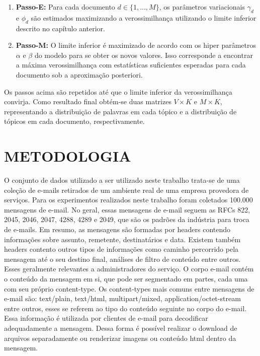 \documentclass[12pt,a4paper]{article}
\begin{document}
\begin{enumerate}
\item \textbf{Passo-E:} Para cada documento $d \in \{1,. . . , M\}$, os parâmetros variacionais $\gamma_d$ e $\phi_d$ são estimados maximizando a verossimilhança utilizando o limite inferior descrito no capítulo anterior.
\item \textbf{Passo-M:} O limite inferior é maximizado  de acordo com os hiper parâmetros $\alpha$ e $\beta$ do modelo para se obter os novos valores. 
 Isso corresponde a encontrar a máxima verossimilhança com estatísticas suficientes esperadas para cada documento sob a aproximação posteriori.
\end{enumerate}

Os passos acima são repetidos até que o limite inferior da verossimilhança convirja. Como resultado final obtém-se duas matrizes $V \times K$ e $M \times K$,
 representando  a distribuição de palavras em cada tópico e a distribuição de tópicos em cada documento, respectivamente.



\section{METODOLOGIA} \label{sec:metodologia}
O conjunto de dados utilizado a ser utilizado neste trabalho trata-se de uma coleção de e-mails retirados de um ambiente real de uma empresa provedora de serviços. 
 Para os experimentos realizados neste trabalho foram coletados 100.000 mensagens de e-mail. No geral, essas mensagens de e-mail seguem as RFCs 822, 2045, 2046, 2047, 4288, 4289 e 2049,
 que são os padrões da indústria para troca de e-mails.	Em resumo, as mensagens são formadas por headers contendo informações sobre assunto, remetente, destinatários e data.
 Existem também headers contento outros tipos de informações como caminho percorrido pela mensagem até o seu destino final, análises de filtro de conteúdo entre outros. Esses geralmente relevantes a administradores do serviço. O corpo e-mail contém o conteúdo da mensagem em si, que pode ser segmentado em  partes, cada uma com seu próprio content-type. 
 Os content-types mais comuns entre mensagens de e-mail são: text/plain, text/html, multipart/mixed, application/octet-stream entre outros, esses se referem ao tipo do conteúdo seguinte no corpo do e-mail.
 Essa informação é utilizada por clientes de e-mail para decodificar adequadamente a mensagem. Dessa forma é possível realizar o download de arquivos separadamente ou renderizar imagens ou conteúdo html dentro da mensagem.
\end{document}
